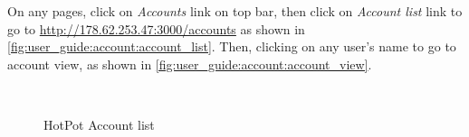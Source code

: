 On any pages, click on \emph{Accounts} link on top bar, then click on \emph{Account list} link to go to \href{http://178.62.253.47:3000/accounts}{http://178.62.253.47:3000/accounts} as shown in \autoref{fig:user_guide:account:account_list}.
Then, clicking on any user's name to go to account view, as shown in \autoref{fig:user_guide:account:account_view}.

\begin{figure}[bth]
\myfloatalign
{} \quad
{} \\
\caption[HotPot Account list]{HotPot Account list}
\label{fig:user_guide:account:account_list}
\end{figure}

\clearpage


